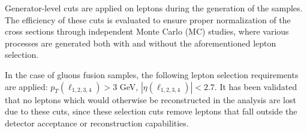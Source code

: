 
Generator-level cuts are applied on leptons during the generation of the samples. The efficiency of these cuts is evaluated to ensure proper normalization of the cross sections through independent Monte Carlo (MC) studies, where various processes are generated both with and without the aforementioned lepton selection. 

In the case of gluons fusion \offshell samples, the following lepton selection requirements are applied:
\noindent $p_T(\ell_{1,2,3,4})> 3$ GeV, $|\eta(\ell_{1,2,3,4})| < 2.7$.
It has been validated that no leptons which would otherwise be reconstructed in the analysis are lost due to these cuts, since these selection cuts remove leptons that fall outside the detector acceptance or reconstruction capabilities. 




